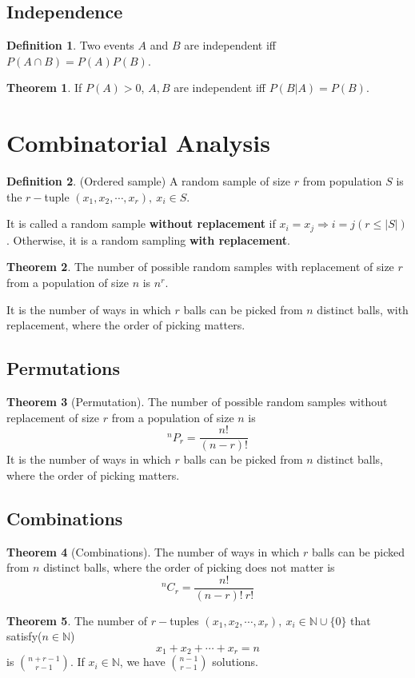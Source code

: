 \documentclass[10pt, a4paper]{extarticle}
\theoremstyle{definition}
\newtheorem{thm}{Theorem}
\newtheorem{defn}{Definition}
\begin{document}
\subsection{Independence}
\begin{defn}
	Two events $A$ and $B$ are independent iff $P(A\cap B)=P(A)P(B)$.
\end{defn}
\begin{thm}
	If $P(A)>0$, $A,B$ are independent iff $P(B|A)=P(B)$.
\end{thm}


\section{Combinatorial Analysis}
\begin{defn}(Ordered sample)
	A random sample of size $r$ from population $S$ is the $r-$tuple $(x_1,x_2,\cdots,x_r),\ x_i\in S$.

	It is called a random sample \textbf{without replacement} if $x_i=x_j\Rightarrow i=j(r\leq|S|)$. Otherwise, it is a random sampling \textbf{with replacement}.
\end{defn}
\begin{thm}
	The number of possible random samples with replacement of size $r$ from a population of size $n$ is $n^r$.

	It is the number of ways in which $r$ balls can be picked from $n$ distinct balls, with replacement, where the order of picking matters.
\end{thm}

\subsection{Permutations}
\begin{thm}[Permutation]
	The number of possible random samples without replacement of size $r$ from a population of size $n$ is
	\[^nP_r=\frac{n!}{(n-r)!}\]
	It is the number of ways in which $r$ balls can be picked from $n$ distinct balls, where the order of picking matters.
\end{thm}

\subsection{Combinations}
\begin{thm}[Combinations]
	The number of ways in which $r$ balls can be picked from $n$ distinct balls, where the order of picking does not matter is
	\[^nC_r=\frac{n!}{(n-r)!\ r!}\]
\end{thm}
\begin{thm}
	The number of $r-$tuples $(x_1,x_2,\cdots,x_r),\ x_i\in\mathbb{N}\cup\{0\}$ that satisfy($n\in\mathbb{N}$)
	\[x_1+x_2+\cdots+x_r=n\] is $\binom{n+r-1}{r-1}$. If $x_i\in\mathbb{N}$, we have $\binom{n-1}{r-1}$ solutions.
\end{thm}
\end{document}
